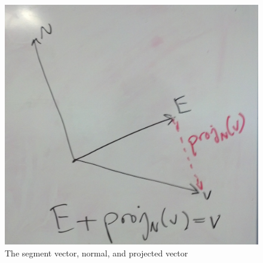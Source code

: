 \begin{figure}[ht]
\centering
\includegraphics[width=\columnwidth]{vectordiagram.jpg}
\caption{The segment vector, normal, and projected vector}
\label{vectordiagram}
\end{figure}

